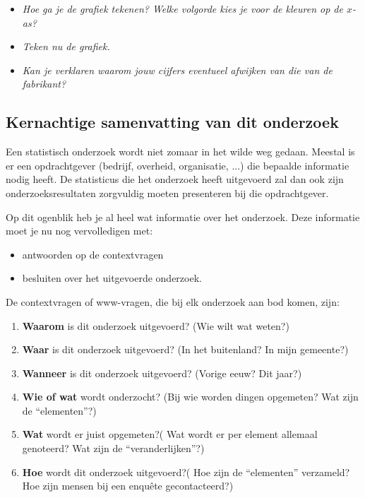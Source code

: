 \documentclass[11pt]{article}
\newcommand{\vraag}[2]{\begin{itemize}\item {\it #1} \vspace*{#2}\end{itemize}}
\begin{document}
\vraag{Hoe ga je de grafiek tekenen? Welke volgorde kies je voor de kleuren op de $x$-as?}{3cm}

\vraag{Teken nu de grafiek.}{0cm}
\begin{center}
  
\end{center}

\vraag{Kan je verklaren waarom jouw cijfers eventueel afwijken van die van de fabrikant?}{3cm}

\subsection{Kernachtige samenvatting van dit onderzoek}

Een statistisch onderzoek wordt niet zomaar in het wilde weg gedaan. Meestal is er een
opdrachtgever (bedrijf, overheid, organisatie, ...) die bepaalde informatie nodig heeft. De statisticus
die het onderzoek heeft uitgevoerd zal dan ook zijn onderzoeksresultaten zorgvuldig moeten
presenteren bij die opdrachtgever.

Op dit ogenblik heb je al heel wat informatie over het onderzoek. Deze informatie moet je nu nog
vervolledigen met:
\begin{itemize}
  \item antwoorden op de contextvragen
  \item besluiten over het uitgevoerde onderzoek.
\end{itemize}

De contextvragen of www-vragen, die bij elk onderzoek aan bod komen, zijn:
\begin{enumerate}
  \item {\bf Waarom} is dit onderzoek uitgevoerd? (Wie wilt wat weten?)
  \item {\bf Waar} is dit onderzoek uitgevoerd? (In het buitenland? In mijn gemeente?)
  \item {\bf Wanneer} is dit onderzoek uitgevoerd? (Vorige eeuw? Dit jaar?)
  \item {\bf Wie of wat} wordt onderzocht? (Bij wie worden dingen opgemeten? Wat zijn de
“elementen”?)
  \item {\bf Wat} wordt er juist opgemeten?( Wat wordt er per element allemaal genoteerd? Wat
zijn de “veranderlijken”?)
  \item {\bf Hoe} wordt dit onderzoek uitgevoerd?( Hoe zijn de “elementen” verzameld? Hoe zijn
mensen bij een enquête gecontacteerd?)
\end{enumerate}
\end{document}
